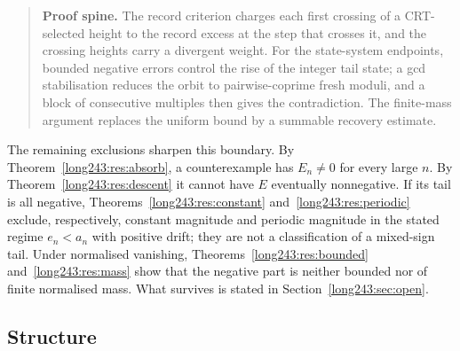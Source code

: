 \documentclass[11pt]{article}
\begin{document}
\begin{quote}
\smallskip
\textbf{Proof spine.}
The record criterion charges each first crossing of a CRT-selected height to
the record excess at the step that crosses it, and the crossing heights carry
a divergent weight.  For the state-system endpoints, bounded negative errors
control the rise of the integer tail state; a gcd stabilisation reduces the
orbit to pairwise-coprime fresh moduli, and a block of consecutive multiples
then gives the contradiction.  The finite-mass argument replaces the uniform
bound by a summable recovery estimate.
\end{quote}

\noindent The remaining exclusions sharpen this boundary.  By
Theorem~\ref{long243:res:absorb}, a counterexample has $E_n\ne0$ for
every large $n$.  By Theorem~\ref{long243:res:descent} it cannot have $E$ eventually
nonnegative.  If its tail is all negative, Theorems~\ref{long243:res:constant}
and~\ref{long243:res:periodic} exclude, respectively, constant magnitude and periodic
magnitude in the stated regime $e_n<a_n$ with positive drift; they are not a
classification of a mixed-sign tail.  Under normalised vanishing,
Theorems~\ref{long243:res:bounded} and~\ref{long243:res:mass} show that the negative part is
neither bounded nor of finite normalised mass.  What survives is stated in
Section~\ref{long243:sec:open}.

\subsection*{Structure}
\end{document}
